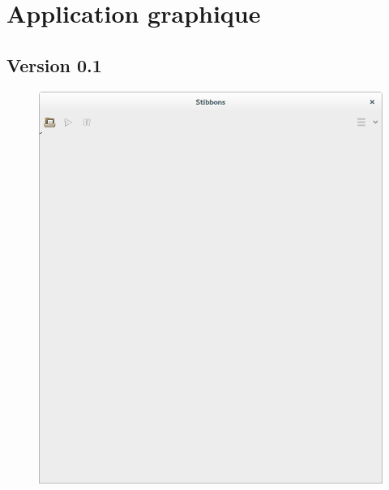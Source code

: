 \section{Application graphique}

\subsection{Version 0.1}

\begin{figure}[h]
\centering
\includegraphics[scale=0.25]{doc/report/screenshot/stibbons-0-1-1.png}

\end{figure}
